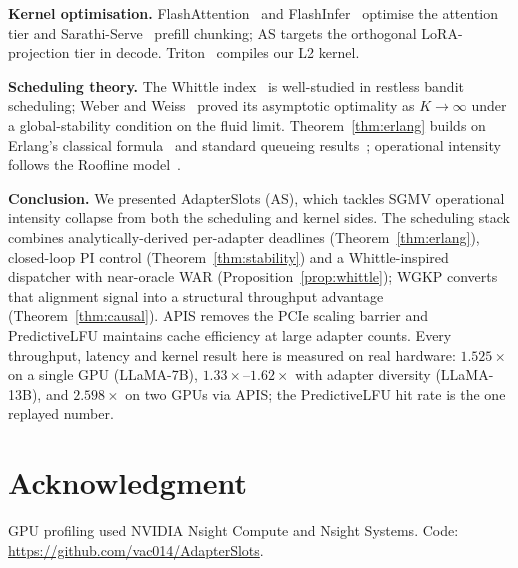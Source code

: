\documentclass[conference]{IEEEtran}
\newcommand{\asys}{AS\xspace}
\begin{document}
\textbf{Kernel optimisation.}
FlashAttention~\cite{dao2022flashattn} and FlashInfer~\cite{ye2024flashinfer}
optimise the attention tier and Sarathi-Serve~\cite{agrawal2024sarathi} prefill
chunking; \asys targets the orthogonal LoRA-projection tier in decode.
Triton~\cite{tillet2019triton} compiles our L2 kernel.

\textbf{Scheduling theory.}
The Whittle index~\cite{whittle1988restless} is well-studied in restless bandit
scheduling; Weber and Weiss~\cite{weber1990index} proved its asymptotic
optimality as $K \to \infty$ under a global-stability condition on the
fluid limit.  Theorem~\ref{thm:erlang} builds on Erlang's
classical formula~\cite{erlang1917theory} and standard queueing
results~\cite{kleinrock1975queueing}; operational intensity follows the Roofline
model~\cite{williams2009roofline}.

\textbf{Conclusion.}
We presented AdapterSlots (\asys), which tackles SGMV operational intensity
collapse from both the scheduling and kernel sides.  The scheduling stack
combines analytically-derived per-adapter deadlines (Theorem~\ref{thm:erlang}),
closed-loop PI control (Theorem~\ref{thm:stability}) and a Whittle-inspired
dispatcher with near-oracle WAR (Proposition~\ref{prop:whittle}); WGKP converts
that alignment signal into a structural throughput advantage
(Theorem~\ref{thm:causal}).  APIS removes the PCIe scaling barrier and
PredictiveLFU maintains cache efficiency at large adapter counts.
Every throughput, latency and kernel result here is measured on real hardware:
$1.525\times$ on a single GPU (LLaMA-7B), $1.33\times$--$1.62\times$ with
adapter diversity (LLaMA-13B), and $2.598\times$ on two GPUs via APIS; the
PredictiveLFU hit rate is the one replayed number.

\section*{Acknowledgment}
GPU profiling used NVIDIA Nsight Compute and Nsight Systems.  Code:
\url{https://github.com/vac014/AdapterSlots}.



\end{document}
